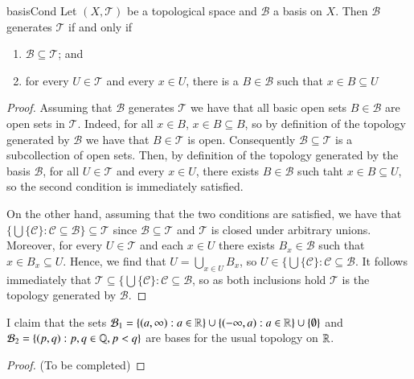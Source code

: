 \documentclass[12pt, a4paper, oneside, openright, titlepage]{book}
\begin{document}
\begin{cor}{}{basisCond}
    Let $(X,\mathcal{T})$ be a topological space and $\mathcal{B}$ a basis on $X$. Then $\mathcal{B}$ generates $\mathcal{T}$ if and only if \begin{enumerate}
        \item $\mathcal{B}\subseteq \mathcal{T}$; and 
        \item for every $U \in \mathcal{T}$ and every $x \in U$, there is a $B \in \mathcal{B}$ such that $x \in B\subseteq U$
    \end{enumerate}
\end{cor}
\begin{proof}

    Assuming that $\mathcal{B}$ generates $\mathcal{T}$ we have that all basic open sets $B \in \mathcal{B}$ are open sets in $\mathcal{T}$. Indeed, for all $x \in B$, $x \in B \subseteq B$, so by definition of the topology generated by $\mathcal{B}$ we have that $B \in \mathcal{T}$ is open. Consequently $\mathcal{B} \subseteq \mathcal{T}$ is a subcollection of open sets. Then, by definition of the topology generated by the basis $\mathcal{B}$, for all $U \in \mathcal{T}$ and every $x \in U$, there exists $B \in \mathcal{B}$ such taht $x \in B\subseteq U$, so the second condition is immediately satisfied.


    On the other hand, assuming that the two conditions are satisfied, we have that $\{\bigcup\{\mathcal{C}\}:\mathcal{C}\subseteq \mathcal{B}\} \subseteq \mathcal{T}$ since $\mathcal{B}\subseteq \mathcal{T}$ and $\mathcal{T}$ is closed under arbitrary unions. Moreover, for every $U \in \mathcal{T}$ and each $x \in U$ there exists $B_x \in \mathcal{B}$ such that $x \in B_x \subseteq U$. Hence, we find that $U = \bigcup_{x \in U}B_x$, so $U \in \{\bigcup\{\mathcal{C}\}:\mathcal{C}\subseteq\mathcal{B}$. It follows immediately that $\mathcal{T} \subseteq \{\bigcup\{\mathcal{C}\}:\mathcal{C}\subseteq\mathcal{B}$, so as both inclusions hold $\mathcal{T}$ is the topology generated by $\mathcal{B}$.
\end{proof}

\begin{xca}
    I claim that the sets $\mathcal{B}_1 = \{(a,\infty): a\in \mathbb R\}\cup\{(-\infty,a):a\in\mathbb R\}\cup\{\emptyset\}$ and $\mathcal{B}_2 = \{(p,q):p,q\in\mathbb Q, p < q\}$ are bases for the usual topology on $\mathbb R$.
\end{xca}
\begin{proof}
    (To be completed)
\end{proof}
\end{document}
